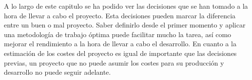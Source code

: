 A lo largo de este capitulo se ha podido ver las decisiones que se han tomado a la hora de llevar a cabo el proyecto. Esta decisiones pueden marcar la diferencia entre un buen o mal proyecto. Saber definirlo desde el primer momento y aplicar una metodología de trabajo óptima puede facilitar mucho la tarea, así como mejorar el rendimiento a la hora de llevar a cabo el desarrollo. En cuanto a la estimación de los costes del proyecto es igual de importante que las decisiones previas, un proyecto que no puede asumir los costes para su producción y desarrollo no puede seguir adelante.
 